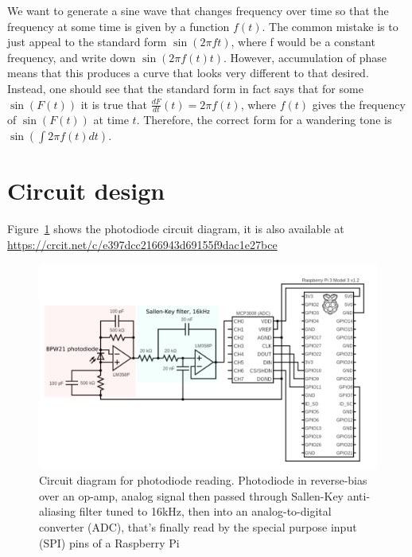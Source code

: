 \documentclass[prb,preprint]{revtex4-1}
\begin{document}
We want to generate a sine wave that changes frequency over time so that the frequency at some time is given by a function $f(t)$. The common mistake is to just appeal to the standard form $\sin{(2 \pi f t)}$, where f would be a constant frequency, and write down $\sin{(2 \pi f(t) t)}$. However, accumulation of phase means that this produces a curve that looks very different to that desired. Instead, one should see that the standard form in fact says that for some $\sin{(F(t))}$ it is true that $\frac{dF}{dt}(t) = 2 \pi f(t)$, where $f(t)$ gives the frequency of $\sin{(F(t))}$ at time $t$. Therefore, the correct form for a wandering tone is $\sin{(\int{2 \pi f(t) dt})}$.

\section{Circuit design}
\label{app:circuit_diagram}

Figure~\ref{fig:circuit_diagram} shows the photodiode circuit diagram, it is also available at \url{https://crcit.net/c/e397dcc2166943d69155f9dac1e27bce}

\begin{figure}%
	\includegraphics[width=\textwidth]{figures/circuit_diagram_2.pdf}
	\caption{Circuit diagram for photodiode reading. Photodiode in reverse-bias over an op-amp, analog signal then passed through Sallen-Key anti-aliasing filter tuned to 16kHz, then into an analog-to-digital converter (ADC), that’s finally read by the special purpose input (SPI) pins of a Raspberry Pi}
	\label{fig:circuit_diagram}
\end{figure}
\end{document}
